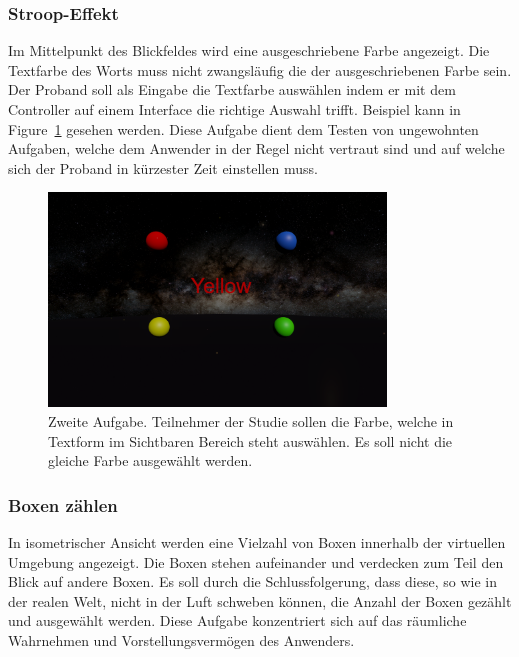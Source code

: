 \subsubsection{Stroop-Effekt} 
Im Mittelpunkt des Blickfeldes wird eine ausgeschriebene Farbe angezeigt. Die Textfarbe des Worts muss nicht zwangsläufig die der ausgeschriebenen Farbe sein. Der Proband soll als Eingabe die Textfarbe auswählen indem er mit dem Controller auf einem Interface die richtige Auswahl trifft. Beispiel kann in Figure~\ref{fig:matching} gesehen werden. Diese Aufgabe dient dem Testen von ungewohnten Aufgaben, welche dem Anwender in der Regel nicht vertraut sind und auf welche sich der Proband in kürzester Zeit einstellen muss.

\begin{figure}
	\centering
	\includegraphics[width=0.8\textwidth]{./images/matching.png}
	\caption{Zweite Aufgabe. Teilnehmer der Studie sollen die Farbe, welche in Textform im Sichtbaren Bereich steht auswählen. Es soll nicht die gleiche Farbe ausgewählt werden.}
	\label{fig:matching}
\end{figure}

\subsubsection{Boxen zählen} 
In isometrischer Ansicht werden eine Vielzahl von Boxen innerhalb der virtuellen Umgebung angezeigt. Die Boxen stehen aufeinander und verdecken zum Teil den Blick auf andere Boxen. Es soll durch die Schlussfolgerung, dass diese, so wie in der realen Welt, nicht in der Luft schweben können, die Anzahl der Boxen gezählt und ausgewählt werden. Diese Aufgabe konzentriert sich auf das räumliche Wahrnehmen und Vorstellungsvermögen des Anwenders.

